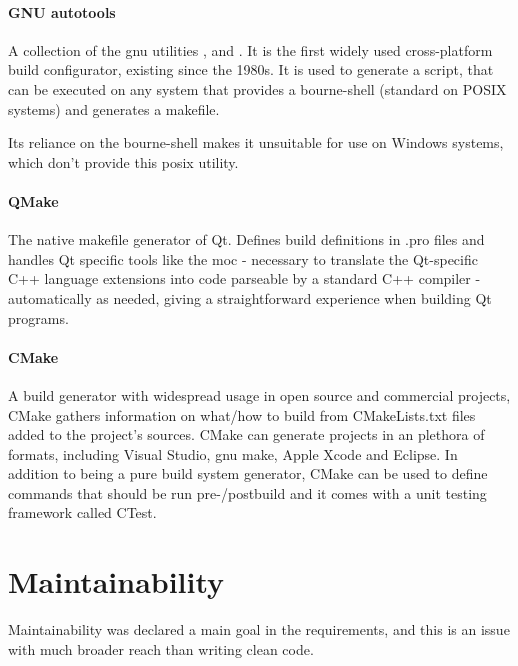 \paragraph{GNU autotools}
A collection of the \gls{gnu} utilities ,  and . It is the first widely used cross-platform build configurator, existing since the 1980s. It is used to generate a  script, that can be executed on any system that provides a bourne-shell (standard on POSIX systems) and generates a makefile.

Its reliance on the bourne-shell makes it unsuitable for use on Windows systems, which don't provide this \gls{posix} utility.

\paragraph{QMake}
The native makefile generator of Qt. Defines build definitions in .pro files and handles Qt specific tools like the \gls{moc} - necessary to translate the Qt-specific C++ language extensions into code parseable by a standard C++ compiler - automatically as needed, giving a straightforward experience when building Qt programs.

\paragraph{CMake}
A build generator with widespread usage in open source and commercial projects, CMake gathers information on what/how to build from CMakeLists.txt files added to the project's sources.
CMake can generate projects in an plethora of formats, including Visual Studio, \gls{gnu} make, Apple Xcode and Eclipse.
In addition to being a pure build system generator, CMake can be used to define commands that should be run pre-/postbuild and it comes with a unit testing framework called CTest.

\section{Maintainability}\label{sec:maintainability}
Maintainability was declared a main goal in the requirements, and this is an issue with much broader reach than writing clean code.

